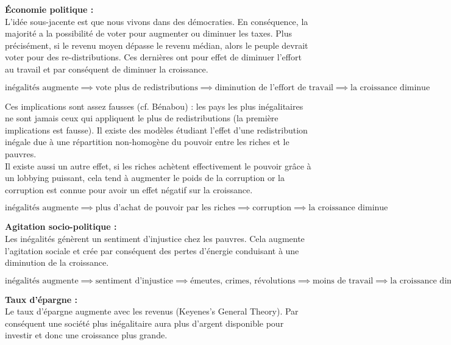 \documentclass[11pt,a4paper]{article}
\begin{document}
\noindent
\textbf{Économie politique :}\\
L'idée sous-jacente est que nous vivons dans des démocraties. En conséquence, la majorité a la possibilité de voter pour augmenter ou diminuer les taxes. Plus précisément, si le revenu moyen dépasse le revenu médian, alors le peuple devrait voter pour des re-distributions. Ces dernières ont pour effet de diminuer l'effort au travail et par conséquent de diminuer la croissance. 

\begin{dmath}
\text{inégalités augmente} \implies \text{vote plus de redistributions} \implies \text{diminution de l'effort de travail} \implies \text{la croissance diminue}
\end{dmath}

Ces implications sont assez fausses (cf. Bénabou) : les pays les plus inégalitaires ne sont jamais ceux qui appliquent le plus de redistributions (la première implications est fausse). Il existe des modèles étudiant l'effet d'une redistribution inégale due à une répartition non-homogène du pouvoir entre les riches et le pauvres. \\

Il existe aussi un autre effet, si les riches achètent effectivement le pouvoir grâce à un lobbying puissant, cela tend à augmenter le poids de la corruption or la corruption est connue pour avoir un effet négatif sur la croissance. 

\begin{dmath}
\text{inégalités augmente} \implies \text{plus d'achat de pouvoir par les riches} \implies \text{corruption} \implies \text{la croissance diminue}
\end{dmath}

\noindent
\textbf{Agitation socio-politique :}\\
Les inégalités génèrent un sentiment d'injustice chez les pauvres. Cela augmente l'agitation sociale et crée par conséquent des pertes d'énergie conduisant à une diminution de la croissance. 

\begin{dmath}
\text{inégalités augmente} \implies \text{sentiment d'injustice} \implies \text{émeutes, crimes, révolutions} \implies \text{moins de travail} \implies \text{la croissance diminue}
\end{dmath}

\noindent
\textbf{Taux d'épargne :}\\
Le taux d'épargne augmente avec les revenus (Keyenes's General Theory). Par conséquent une société plus inégalitaire aura plus d'argent disponible pour investir et donc une croissance plus grande. 
\end{document}
